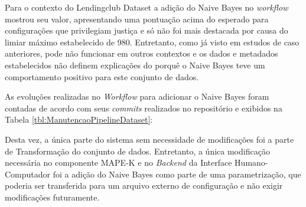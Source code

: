 \documentclass[twocolumn]{article}
\begin{document}
Para o contexto do Lendingclub Dataset a adição do Naive Bayes no \textit{workflow} mostrou seu valor, apresentando uma pontuação acima do esperado para configurações que privilegiam justiça e só não foi mais destacada por causa do limiar máximo estabelecido de 980. Entretanto, como já visto em estudos de caso anteriores, pode não funcionar em outros contextos e os dados e metadados estabelecidos não definem explicações do porquê o Naive Bayes teve um comportamento positivo para este conjunto de dados.

As evoluções realizadas no \textit{Workflow} para adicionar o Naive Bayes foram contadas de acordo com seus \textit{commits} realizados no repositório e exibidos  na Tabela \ref{tbl:ManutencaoPipelineDataset}:

\begin{table}[H]
\begin{center}
  \caption{Quantidade de modificações realizadas ao adicionar um novo algoritmo ao \textit{Workflow}}
\label{tbl:ManutencaoPipelineCaso3}
\end{center}
\end{table}

Desta vez, a única parte do sistema sem necessidade de modificações foi a parte de Transformação do conjunto de dados. Entretanto, a única modificação necessária no componente MAPE-K e no \textit{Backend} da Interface Humano-Computador foi a adição do Naive Bayes como parte de uma parametrização, que poderia ser transferida para um arquivo externo de configuração e não exigir modificações futuramente.
\end{document}
